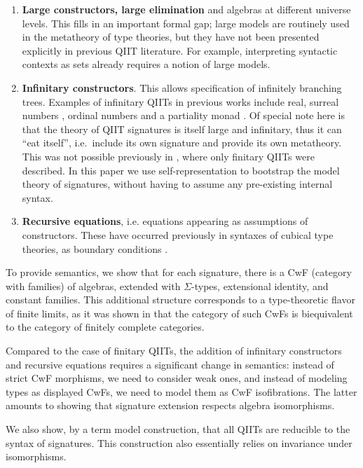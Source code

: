 \documentclass{article}
\theoremstyle{definition}
\theoremstyle{theorem}
\begin{document}
\begin{enumerate}
  \item
  \textbf{Large constructors, large elimination} and algebras at different
  universe levels. This fills in an important formal gap; large models are
  routinely used in the metatheory of type theories, but they have not been
  presented explicitly in previous QIIT literature. For example, interpreting
  syntactic contexts as sets already requires a notion of large models.
  \item
  \textbf{Infinitary constructors}.
  This allows specification of infinitely branching trees. Examples of
  infinitary QIITs in previous works include real, surreal numbers
  \cite{HoTTbook}, ordinal numbers \cite{lumsdaineShulman} and a partiality
  monad \cite{partiality}. Of special note here is that the theory of QIIT
  signatures is itself large and infinitary, thus it can ``eat itself'',
  i.e.\ include its own signature and provide its own metatheory. This was not
  possible previously in \cite{kaposi2019constructing}, where only finitary
  QIITs were described. In this paper we use self-representation to bootstrap
  the model theory of signatures, without having to assume any pre-existing
  internal syntax.
  \item
  \textbf{Recursive equations}, i.e. equations appearing as assumptions of
  constructors. These have occurred previously in syntaxes of cubical type
  theories, as boundary conditions \cite{cchm, angiuli2016computational,
    angiuli2018cartesian}.
\end{enumerate}

To provide semantics, we show that for each signature, there is a CwF (category
with families) of algebras, extended with $\Sigma$-types, extensional identity,
and constant families. This additional structure corresponds to a type-theoretic
flavor of finite limits, as it was shown in \cite{clairambault2014biequivalence}
that the category of such CwFs is biequivalent to the category of finitely
complete categories.

Compared to the case of finitary QIITs, the addition of infinitary constructors
and recursive equations requires a significant change in semantics: instead of
strict CwF morphisms, we need to consider weak ones, and instead of modeling
types as displayed CwFs, we need to model them as CwF isofibrations. The latter
amounts to showing that signature extension respects algebra isomorphisms.

We also show, by a term model construction, that all QIITs are reducible to the
syntax of signatures. This construction also essentially relies on invariance under
isomorphisms.
\end{document}
